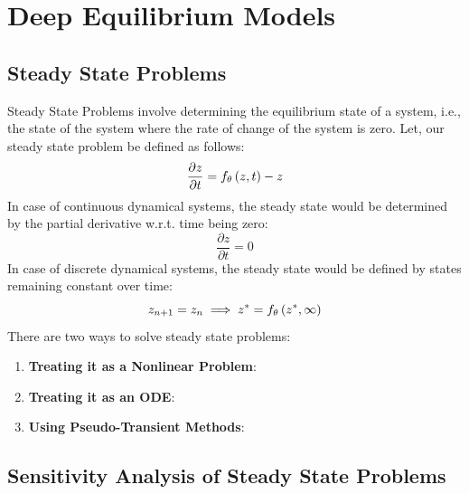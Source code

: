 \chapter{Deep Equilibrium Models}
\label{chapter:deep_equilibrium_models}

\section{Steady State Problems}
\label{sec:steady_state_problems}

Steady State Problems involve determining the equilibrium state of a system, i.e., the state of the system where the rate of change of the system is zero. Let, our steady state problem be defined as follows:
%
\begin{equation}
  \frac{\partial z}{\partial t} = f_\theta\left(z, t\right) - z
\end{equation}
%
In case of continuous dynamical systems, the steady state would be determined by the partial derivative w.r.t. time being zero:
%
\begin{equation}
  \frac{\partial z}{\partial t} = 0
\end{equation}
%
In case of discrete dynamical systems, the steady state would be defined by states remaining constant over time:
%
\begin{equation}
  z_{n + 1} = z_n \implies z^* = f_\theta\left(z^*, \infty\right)
\end{equation}
%
There are two ways to solve steady state problems:
%
\begin{enumerate}
  \item \textbf{Treating it as a Nonlinear Problem}: \todo{}
  \item \textbf{Treating it as an ODE}: \todo{}
  \item \textbf{Using Pseudo-Transient Methods}: \todo{}
\end{enumerate}
%


\section{Sensitivity Analysis of Steady State Problems}
\label{sec:sensitivity_analysis_ssproblems}


